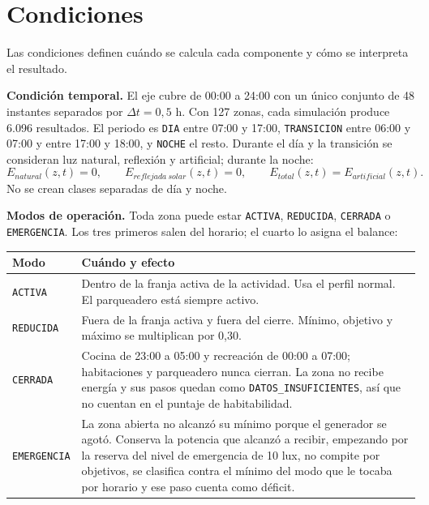 \documentclass[12pt,a4paper]{article}
\newcommand{\estado}[1]{\texttt{#1}}
\newcommand{\codigo}[1]{\texttt{#1}}
\begin{document}
\section{Condiciones}

Las condiciones definen cuándo se calcula cada componente y cómo se interpreta el resultado.

\textbf{Condición temporal.} El eje cubre de 00:00 a 24:00 con un único conjunto de 48 instantes separados por $\Delta t=0,5$ h. Con 127 zonas, cada simulación produce 6.096 resultados. El periodo es \codigo{DIA} entre 07:00 y 17:00, \codigo{TRANSICION} entre 06:00 y 07:00 y entre 17:00 y 18:00, y \codigo{NOCHE} el resto. Durante el día y la transición se consideran luz natural, reflexión y artificial; durante la noche:
\begin{equation}
 E_{natural}(z,t)=0,\qquad E_{reflejada\ solar}(z,t)=0,\qquad E_{total}(z,t)=E_{artificial}(z,t).
 \label{eq:noche}
\end{equation}
No se crean clases separadas de día y noche.

\textbf{Modos de operación.} Toda zona puede estar \estado{ACTIVA}, \estado{REDUCIDA}, \estado{CERRADA} o \estado{EMERGENCIA}. Los tres primeros salen del horario; el cuarto lo asigna el balance:

\begin{center}\small
\begin{tabular}{p{}p{}}
\toprule
\textbf{Modo} & \textbf{Cuándo y efecto}\\
\midrule
\estado{ACTIVA} & Dentro de la franja activa de la actividad. Usa el perfil normal. El parqueadero está siempre activo.\\
\estado{REDUCIDA} & Fuera de la franja activa y fuera del cierre. Mínimo, objetivo y máximo se multiplican por 0,30.\\
\estado{CERRADA} & Cocina de 23:00 a 05:00 y recreación de 00:00 a 07:00; habitaciones y parqueadero nunca cierran. La zona no recibe energía y sus pasos quedan como \estado{DATOS\_INSUFICIENTES}, así que no cuentan en el puntaje de habitabilidad.\\
\estado{EMERGENCIA} & La zona abierta no alcanzó su mínimo porque el generador se agotó. Conserva la potencia que alcanzó a recibir, empezando por la reserva del nivel de emergencia de 10 lux, no compite por objetivos, se clasifica contra el mínimo del modo que le tocaba por horario y ese paso cuenta como déficit.\\
\bottomrule
\end{tabular}
\end{center}
\end{document}
